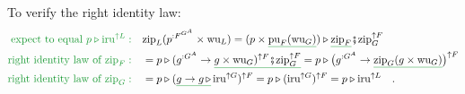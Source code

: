 To verify the right identity law:
\begin{align*}
{\color{greenunder}\text{expect to equal }p\triangleright\text{iru}^{\uparrow L}:}\quad & \text{zip}_{L}(p^{:F^{G^{A}}}\times\text{wu}_{L})=(p\times\gunderline{\text{pu}_{F}(\text{wu}_{G})})\triangleright\gunderline{\text{zip}_{F}}\bef\text{zip}_{G}^{\uparrow F}\\
{\color{greenunder}\text{right identity law of }\text{zip}_{F}:}\quad & =p\triangleright(g^{:G^{A}}\rightarrow\gunderline{g\times\text{wu}_{G})^{\uparrow F}\bef\text{zip}_{G}^{\uparrow F}}=p\triangleright\big(g^{:G^{A}}\rightarrow\gunderline{\text{zip}_{G}(g\times\text{wu}_{G})}\big)^{\uparrow F}\\
{\color{greenunder}\text{right identity law of }\text{zip}_{G}:}\quad & =p\triangleright(\gunderline{g\rightarrow g\,\triangleright}\,\text{iru}^{\uparrow G})^{\uparrow F}=p\triangleright(\text{iru}^{\uparrow G})^{\uparrow F}=p\triangleright\text{iru}^{\uparrow L}\quad.
\end{align*}

